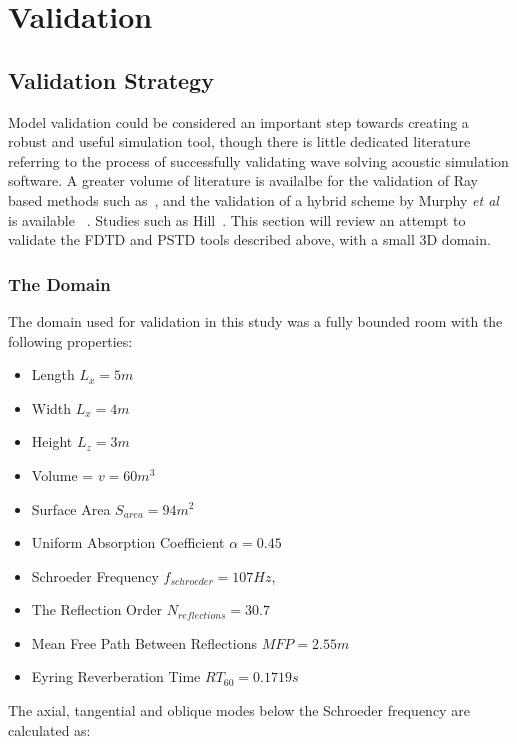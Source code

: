
\chapter{Validation}
\section{Validation Strategy}
Model validation could be considered an important step towards creating a robust and useful simulation tool, though there is little dedicated literature referring to the process of successfully validating wave solving acoustic simulation software. A greater volume of literature is availalbe for the validation of Ray based methods such as~\cite{Ahnert2005,Tsingos2002}, and the validation of a hybrid scheme by Murphy \textit{et al} is available ~\cite{Southern2013}. Studies such as Hill~\cite{Hill2012}. This section will review an attempt to validate the FDTD and PSTD tools described above, with a small 3D domain.\\

\subsection{The Domain}
The domain used for validation in this study was a fully bounded room with the following properties:\\

\begin{itemize}
\item Length $L_x = 5m$
\item Width $L_x = 4m$
\item Height $L_z = 3m$
\item Volume = $ v = 60m^3$
\item Surface Area $S_{area} = 94m^2$
\item Uniform Absorption Coefficient $\alpha = 0.45 $
\item Schroeder Frequency  $f_{schroeder} = 107Hz $,
\item The Reflection Order $N_{reflections} = 30.7$
\item Mean Free Path Between Reflections $MFP = 2.55m$
\item Eyring Reverberation Time $RT_{60} = 0.1719s $
\end{itemize}

The axial, tangential and oblique modes below the Schroeder frequency are calculated as:\\


